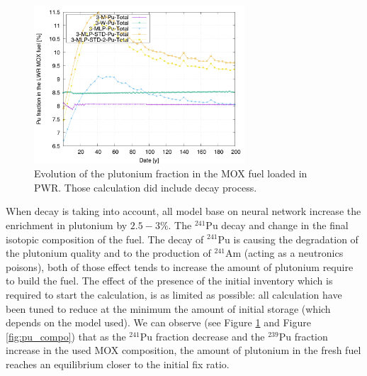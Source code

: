 \documentclass[10pt]{article}
\begin{document}
\begin{figure}[h!]
  \centering
  \includegraphics[width=0.7\textwidth]  {img/C_1_3_MOX_pu_contribution}
  \caption{Evolution of the plutonium fraction in the MOX fuel loaded in PWR.
  Those calculation did include decay process.}
  \label{fig:puflow_D}
\end{figure}
%  
%

When decay is taking into account, all model base on neural network increase the
enrichment in plutonium by $2.5-3\%$. The $^{241}$Pu decay and change in the
final isotopic composition of the fuel.  The decay of $^{241}$Pu is causing the
degradation of the plutonium quality and to the production of $^{241}$Am (acting
as a neutronics poisons), both of those effect tends to increase the amount of
plutonium require to build the fuel.
The effect of the presence of the initial inventory which is required to start
the calculation, is as limited as possible: all calculation have been tuned to
reduce at the minimum the amount of initial storage (which depends on the model
used).
We can observe (see Figure \ref{fig:puflow_D} and Figure \ref{fig:pu_compo})
that as the $^{241}$Pu fraction decrease and the $^{239}$Pu fraction increase in
the used MOX composition, the amount of plutonium in the fresh fuel reaches an
equilibrium closer to the initial fix ratio.
\end{document}
